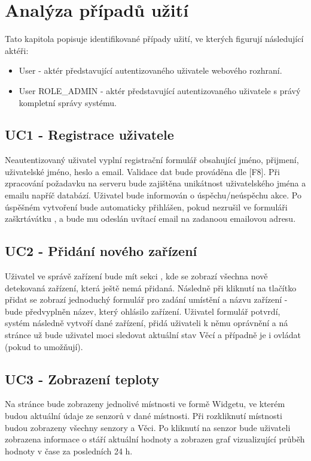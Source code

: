 \section{Analýza případů užití}
Tato kapitola popisuje identifikované případy užití, ve kterých figurují následující aktéři:
\begin{itemize}
    \item User - aktér představující autentizovaného uživatele webového rozhraní.
    \item User ROLE\_ADMIN - aktér představující autentizovaného uživatele s právý kompletní správy systému.
\end{itemize}

\subsection{UC1 - Registrace uživatele}
Neautentizovaný uživatel vyplní registrační formulář obsahující jméno, přijmení, uživatelské jméno, heslo a email. Validace dat bude prováděna dle [F8]. Při zpracování požadavku na serveru bude zajištěna unikátnost uživatelského jména a emailu napříč databází. Uživatel bude informován o úspěchu/neúspěchu akce. Po úspěšném vytvoření bude automaticky přihlášen, pokud nezrušil ve formuláři zaškrtávátku , a bude mu odeslán uvítací email na zadanoou emailovou adresu.

\subsection{UC2 - Přidání nového zařízení}
\label{UC:UC2}
Uživatel ve správě zařízení bude mít sekci , kde se zobrazí všechna nově detekovaná zařízení, která ještě nemá přidaná. Následně při kliknutí na tlačítko přidat se zobrazí jednoduchý formulář pro zadání umístění a názvu zařízení - bude předvyplněn název, který ohlásilo zařízení. Uživatel formulář potvrdí, systém následně vytvoří dané zařízení, přidá uživateli k němu oprávnění a ná stránce  už bude uživatel moci sledovat aktuální stav Věcí a případně je i ovládat (pokud to umožňují).

\subsection{UC3 - Zobrazení teploty}
Na stránce  bude zobrazeny jednolivé místnosti ve formě Widgetu, ve kterém budou aktuální údaje ze senzorů v dané místnosti. Při rozkliknutí místnosti budou zobrazeny všechny senzory a Věci. Po kliknutí na senzor bude uživateli zobrazena informace o stáří aktuální hodnoty a zobrazen graf vizualizující průběh hodnoty v čase za posledních 24 h.

